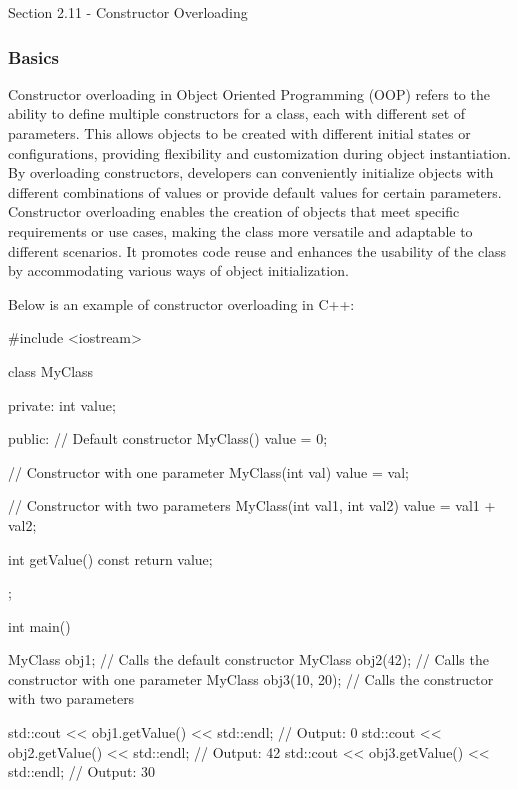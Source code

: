 \begin{notes}{Section 2.11 - Constructor Overloading}
    \subsubsection*{Basics}

    Constructor overloading in Object Oriented Programming (OOP) refers to the ability to define multiple constructors for a class, each with different set of parameters. This allows objects to be created with different initial states or configurations, providing flexibility and customization 
    during object instantiation. By overloading constructors, developers can conveniently initialize objects with different combinations of values or provide default values for certain parameters. Constructor overloading enables the creation of objects that meet specific requirements or use cases, 
    making the class more versatile and adaptable to different scenarios. It promotes code reuse and enhances the usability of the class by accommodating various ways of object initialization.
    
    \begin{highlight}
        Below is an example of constructor overloading in C++:
    \begin{code}[C++]
    #include <iostream>
    
    class MyClass {
    private:
        int value;
    
    public:
        // Default constructor
        MyClass() {
            value = 0;
        }
    
        // Constructor with one parameter
        MyClass(int val) {
            value = val;
        }
    
        // Constructor with two parameters
        MyClass(int val1, int val2) {
            value = val1 + val2;
        }
    
        int getValue() const {
            return value;
        }
    };
    
    int main() {
        MyClass obj1;               // Calls the default constructor
        MyClass obj2(42);           // Calls the constructor with one parameter
        MyClass obj3(10, 20);       // Calls the constructor with two parameters
    
        std::cout << obj1.getValue() << std::endl;    // Output: 0
        std::cout << obj2.getValue() << std::endl;    // Output: 42
        std::cout << obj3.getValue() << std::endl;    // Output: 30
    
}
\end{code}
\end{highlight}
\end{notes}

